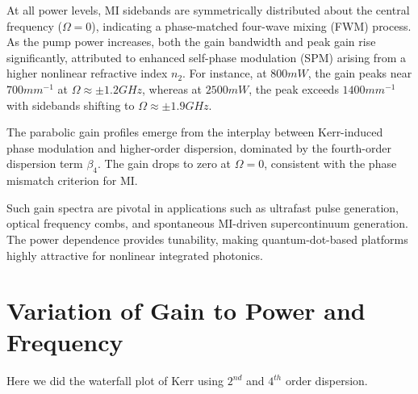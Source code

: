 \documentclass[12pt,a4paper]{article}
\begin{document}
At all power levels, MI sidebands are symmetrically distributed about the central frequency (\( \Omega = 0 \)), indicating a phase-matched four-wave mixing (FWM) process. As the pump power increases, both the gain bandwidth and peak gain rise significantly, attributed to enhanced self-phase modulation (SPM) arising from a higher nonlinear refractive index \( n_2 \). For instance, at ${800}{mW}$, the gain peaks near ${700}{mm^{-1}}$ at \( \Omega \approx \pm {1.2}{GHz} \), whereas at ${2500}{mW}$, the peak exceeds ${1400}{mm^{-1}}$ with sidebands shifting to \( \Omega \approx \pm {1.9}{GHz} \).

The parabolic gain profiles emerge from the interplay between Kerr-induced phase modulation and higher-order dispersion, dominated by the fourth-order dispersion term \( \beta_4 \). The gain drops to zero at \( \Omega = 0 \), consistent with the phase mismatch criterion for MI.

Such gain spectra are pivotal in applications such as ultrafast pulse generation, optical frequency combs, and spontaneous MI-driven supercontinuum generation. The power dependence provides tunability, making quantum-dot-based platforms highly attractive for nonlinear integrated photonics.
\newpage

\section{Variation of Gain to Power and Frequency}

Here we did the waterfall plot of Kerr using $2^{nd}$ and \(4^{th}\) order dispersion. 
\end{document}
